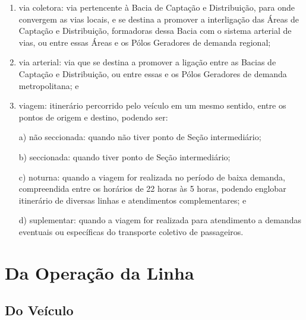 \begin{enumerate}[resume,label=Art. \arabic*]
\begin{enumerate}[label=\roman*.]
\item via coletora: via pertencente à Bacia de Captação e Distribuição, para onde convergem as vias locais, e se destina a promover a interligação das Áreas de Captação e Distribuição, formadoras dessa Bacia com o sistema arterial de vias, ou entre essas Áreas e os Pólos Geradores de demanda regional;

\item via arterial: via que se destina a promover a ligação entre as Bacias de Captação e Distribuição, ou entre essas e os Pólos Geradores de demanda metropolitana; e

\item viagem: itinerário percorrido pelo veículo em um mesmo sentido, entre os pontos de origem e destino, podendo ser:

a) não seccionada: quando não tiver ponto de Seção intermediário;

b) seccionada: quando tiver ponto de Seção intermediário;

c) noturna: quando a viagem for realizada no período de baixa demanda, compreendida entre os horários de 22 horas às 5 horas, podendo englobar itinerário de diversas linhas e atendimentos complementares; e

d) suplementar: quando a viagem for realizada para atendimento a demandas eventuais ou específicas do transporte coletivo de passageiros.

\end{enumerate}

\end{enumerate}

\section{Da Operação da Linha}

\subsection{Do Veículo}

